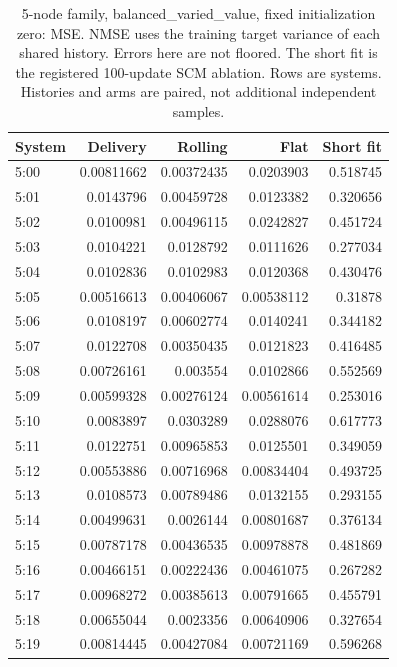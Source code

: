 \clearpage
\begin{table}[ht]
\centering\scriptsize
\begin{tabular}{lrrrr}
\toprule
System & Delivery & Rolling & Flat & Short fit\\
\midrule
5:00 & 0.00811662 & 0.00372435 & 0.0203903 & 0.518745\\
5:01 & 0.0143796 & 0.00459728 & 0.0123382 & 0.320656\\
5:02 & 0.0100981 & 0.00496115 & 0.0242827 & 0.451724\\
5:03 & 0.0104221 & 0.0128792 & 0.0111626 & 0.277034\\
5:04 & 0.0102836 & 0.0102983 & 0.0120368 & 0.430476\\
5:05 & 0.00516613 & 0.00406067 & 0.00538112 & 0.31878\\
5:06 & 0.0108197 & 0.00602774 & 0.0140241 & 0.344182\\
5:07 & 0.0122708 & 0.00350435 & 0.0121823 & 0.416485\\
5:08 & 0.00726161 & 0.003554 & 0.0102866 & 0.552569\\
5:09 & 0.00599328 & 0.00276124 & 0.00561614 & 0.253016\\
5:10 & 0.0083897 & 0.0303289 & 0.0288076 & 0.617773\\
5:11 & 0.0122751 & 0.00965853 & 0.0125501 & 0.349059\\
5:12 & 0.00553886 & 0.00716968 & 0.00834404 & 0.493725\\
5:13 & 0.0108573 & 0.00789486 & 0.0132155 & 0.293155\\
5:14 & 0.00499631 & 0.0026144 & 0.00801687 & 0.376134\\
5:15 & 0.00787178 & 0.00436535 & 0.00978878 & 0.481869\\
5:16 & 0.00466151 & 0.00222436 & 0.00461075 & 0.267282\\
5:17 & 0.00968272 & 0.00385613 & 0.00791665 & 0.455791\\
5:18 & 0.00655044 & 0.0023356 & 0.00640906 & 0.327654\\
5:19 & 0.00814445 & 0.00427084 & 0.00721169 & 0.596268\\
\bottomrule
\end{tabular}
\caption{5-node family, balanced\_varied\_value, fixed initialization zero: MSE. NMSE uses the training target variance of each shared history. Errors here are not floored. The short fit is the registered 100-update SCM ablation. Rows are systems. Histories and arms are paired, not additional independent samples.}
\end{table}
